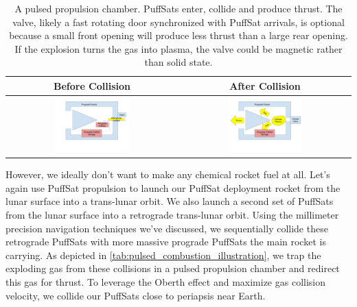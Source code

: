 \documentclass{article}
\begin{document}
{\begin{table}[htpb!]
    \centering
    \begin{tabular}{|c|c|}
        \hline
        Before Collision & After Collision \\\hline
        \includegraphics[width=0.45\textwidth]{images/Pulsed Propulsion Chamber Before Impact.png} &
        \includegraphics[width=0.45\textwidth]{images/_Pulsed Propulsion Chamber After Impact.png} \\ \hline
         
    \end{tabular}
    \caption{A pulsed propulsion chamber.   PuffSats enter, collide and produce thrust.   The valve, likely a fast rotating door synchronized with PuffSat arrivals, is optional because a small front opening will produce less thrust than a large rear opening.  If the explosion turns the gas into plasma, the valve could be magnetic rather than solid state.}
    \label{tab:pulsed_combustion_illustration}
\end{table}

However, we ideally don't want to make any chemical rocket fuel at all.   Let's again use PuffSat propulsion to launch our PuffSat deployment rocket from the lunar surface into a trans-lunar orbit.   We also launch a second set of PuffSats from the lunar surface into a retrograde trans-lunar orbit.   Using the millimeter precision navigation techniques we've discussed, we sequentially collide these retrograde PuffSats with more massive prograde PuffSats the main rocket is carrying.  As depicted in \autoref{tab:pulsed_combustion_illustration}, we trap the exploding gas from these collisions in a pulsed propulsion chamber and redirect this gas for thrust.   To leverage the Oberth effect and maximize gas collision velocity, we collide our PuffSats close to periapsis near Earth.

}
\end{document}
